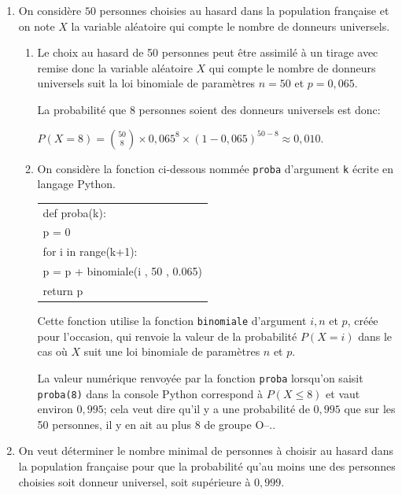 \documentclass[10pt]{article}
\begin{document}
\begin{enumerate}
\item On considère $50$ personnes choisies au hasard dans la population française et on note $X$ la variable aléatoire qui compte le nombre de donneurs universels.
	\begin{enumerate}
		\item 
Le choix au hasard de 50 personnes peut être assimilé à un tirage avec remise donc la variable aléatoire $X$ qui compte le nombre de donneurs universels suit la loi binomiale de paramètres $n=50$ et $p=0,065$.

La probabilité que 8 personnes soient des donneurs universels est donc:

$P\left( X=8\right ) = \displaystyle\binom{50}{8}\times 0,065^{8}\times \left (1-0,065\right )^{50-8} \approx 0,010$.

		\item On considère la fonction ci-dessous nommée \texttt{proba} d'argument \texttt{k} écrite en langage Python.
		
\begin{center}
\ttfamily
\begin{tabular}{|l|}
\hline
def proba(k):\\
\quad p = 0\\
\quad for i in range(k+1):\\
\quad \quad p = p + binomiale(i , 50 , 0.065)\\ 
\quad return p\\ 
\hline
\end{tabular}
\end{center}

Cette fonction utilise la fonction \texttt{binomiale} d'argument $i, n$ et $p$, créée pour l'occasion, qui renvoie la valeur de la probabilité $P(X = i)$ dans le cas où $X$ suit une loi binomiale de paramètres $n$ et $p$.



La valeur numérique renvoyée par la fonction \texttt{proba} lorsqu'on saisit \texttt{proba(8)} dans la console Python correspond à $P\left ( X\leqslant 8 \right )$ et vaut environ $0,995$; cela veut dire qu'il y a une probabilité de $0,995$ que sur les 50 personnes, il y en ait au plus 8 de groupe O--..
	\end{enumerate}
	
\item On veut déterminer le nombre minimal de personnes à choisir au hasard dans la population française pour que la probabilité qu'au moins une des personnes choisies soit donneur universel, soit supérieure à $0,999$.


\end{enumerate}
\end{document}
